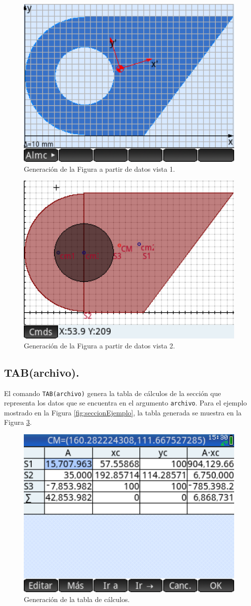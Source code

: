 \documentclass[spanish,xcolor=pdftex,dvipsnames,table,mathserif]{scrartcl}
\begin{document}
\begin{figure}[H]
	\centering
	\caption[Generación de la Figura a partir de datos vista 1.]{Generación de la Figura a partir de datos vista 1.}
	\label{fig:res1}
	\includegraphics[width=0.45\linewidth]{imagenes/resultadoFig1}
\end{figure}
\begin{figure}[H]
	\centering
	\caption[Generación de la Figura a partir de datos vista 2.]{Generación de la Figura a partir de datos vista 2.}
	\label{fig:res2}
	\includegraphics[width=0.45\linewidth]{imagenes/resultadoFig2}
\end{figure}
\subsection{TAB(archivo).}
El comando \verb|TAB(archivo)| genera la tabla de cálculos de la sección que representa los datos que se encuentra en el argumento \verb|archivo|. Para el ejemplo mostrado en la Figura \ref{fig:seccionEjemplo}, la tabla generada se muestra en la Figura \ref{fig:tab}.

\begin{figure}[H]
	\centering
	\caption[Generación de la tabla de cálculos.]{Generación de la tabla de cálculos.}
	\label{fig:tab}
	\includegraphics[width=0.45\linewidth]{imagenes/resultadoTAB}
\end{figure}
\end{document}
